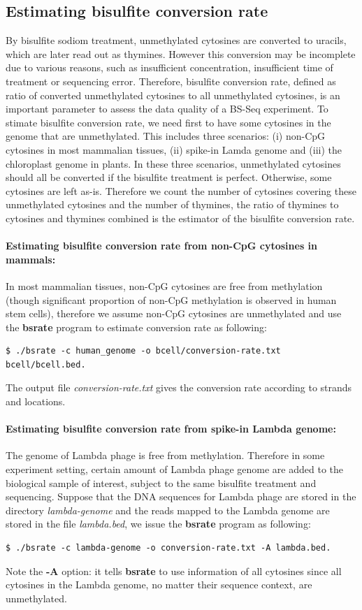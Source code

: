 \documentclass{article}
\begin{document}
\subsection{Estimating bisulfite conversion rate}
\label{sec:estim-busilf-conv}
By bisulfite sodiom treatment, unmethylated cytosines are converted to
uracils, which are later read out as thymines. However this conversion
may be incomplete due to various reasons, such as insufficient
concentration, insufficient time of treatment or sequencing
error. Therefore, bisulfite conversion rate, defined as ratio of
converted unmethylated cytosines to all unmethylated cytosines, is an
important parameter to assess the data quality of a BS-Seq
experiment. To stimate bisulfite conversion rate, we need first to
have some cytosines in the genome that are unmethylated. This includes
three scenarios: (i) non-CpG cytosines in most mammalian tissues, (ii)
spike-in Lamda genome and (iii) the chloroplast genome in plants. In
these three scenarios, unmethylated cytosines should all be converted
if the bisulfite treatment is perfect. Otherwise, some cytosines are
left as-is. Therefore we count the number of cytosines covering these
unmethylated cytosines and the number of thymines, the ratio of
thymines to cytosines and thymines combined is the estimator of the
bisulfite conversion rate.

\paragraph{Estimating bisulfite conversion rate from non-CpG cytosines
  in mammals:} In most mammalian tissues, non-CpG cytosines are free
from methylation (though significant proportion of non-CpG methylation
is observed in human stem cells), therefore we assume non-CpG
cytosines are unmethylated and use the \textbf{bsrate} program to
estimate conversion rate as following:
\begin{verbatim}
$ ./bsrate -c human_genome -o bcell/conversion-rate.txt bcell/bcell.bed.  
\end{verbatim}
The output file \textit{conversion-rate.txt} gives the conversion rate
according to strands and locations. 
  
\paragraph{Estimating bisulfite conversion rate from spike-in Lambda
  genome:} The genome of Lambda phage is free from
methylation. Therefore in some experiment setting, certain amount of
Lambda phage genome are added to the biological sample of interest,
subject to the same bisulfite treatment and sequencing.  Suppose that
the DNA sequences for Lambda phage are stored in the directory
\textit{lambda-genome} and the reads mapped to the Lambda genome are
stored in the file \textit{lambda.bed}, we issue the \textbf{bsrate}
program as following:
\begin{verbatim}
$ ./bsrate -c lambda-genome -o conversion-rate.txt -A lambda.bed.  
\end{verbatim}
Note the \textbf{-A} option: it tells \textbf{bsrate} to use
information of all cytosines since all cytosines in the Lambda genome,
no matter their sequence context, are unmethylated.
\end{document}
